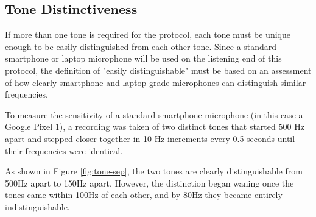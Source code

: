 \subsection{Tone Distinctiveness}
\label{subsec:tone-distinctiveness}

If more than one tone is required for the protocol, each tone must be
unique enough to be easily distinguished from each other tone. Since a
standard smartphone or laptop microphone will be used on the listening
end of this protocol, the definition of "easily distinguishable" must
be based on an assessment of how clearly smartphone and laptop-grade
microphones can distinguish similar frequencies.

To measure the sensitivity of a standard smartphone microphone (in this
case a Google Pixel 1), a recording was taken of two distinct tones
that started 500 Hz apart and stepped closer together in 10 Hz
increments every 0.5 seconds until their frequencies were identical.

As shown in Figure \ref{fig:tone-sep}, the two tones are clearly
distinguishable from 500Hz apart to 150Hz apart. However, the
distinction began waning once the tones came within 100Hz of each
other, and by 80Hz they became entirely indistinguishable.

